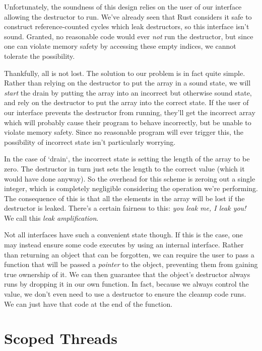 Unfortunately, the soundness of this design relies on the user of our interface
allowing the destructor to run. We've already seen that Rust considers it safe
to construct reference-counted cycles which leak destructors, so this interface
isn't sound. Granted, no reasonable code would ever \emph{not} run the
destructor, but since one can violate memory safety by accessing these empty
indices, we cannot tolerate the possibility.

Thankfully, all is not lost. The solution to our problem is in fact quite simple.
Rather than relying on the destructor to put the array in a sound state,
we will \emph{start} the drain by putting the array into an incorrect but otherwise
sound state, and rely on the destructor to put the array into the correct state.
If the user of our interface prevents the destructor from running,
they'll get the incorrect array which will probably cause their program to behave
incorrectly, but be unable to violate memory safety. Since no reasonable program
will ever trigger this, the possibility of incorrect state isn't particularly
worrying.

In the case of `drain`, the incorrect state is setting the length of the array to be zero.
The destructor in turn just sets the length to the correct value (which it would
have done anyway). So the overhead for this scheme is zeroing out a single
integer, which is completely negligible considering the operation we're performing.
The consequence of this is that all the elements in the array will be
lost if the destructor is leaked. There's a certain fairness to this:
\emph{you leak me, I leak you!} We call this \emph{leak amplification}.

Not all interfaces have such a convenient state though. If this is the case, one
may instead ensure some code executes by using an internal interface. Rather
than returning an object that can be forgotten, we can require the user to pass a
function that will be passed a \emph{pointer} to the object, preventing them from
gaining true ownership of it. We can then guarantee that the object's
destructor always runs by dropping it in our own function. In fact, because we
always control the value, we don't even need to use a destructor to ensure the
cleanup code runs. We can just have that code at the end of the function.





\section{Scoped Threads}


